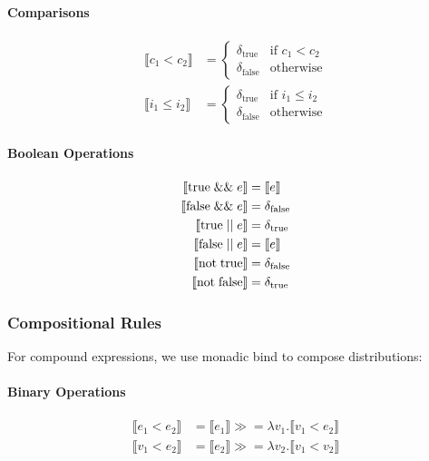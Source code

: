 \paragraph{Comparisons}
\begin{align*}
\llbracket c_1 < c_2 \rrbracket &= \begin{cases}
    \delta_{\text{true}} & \text{if } c_1 < c_2 \\
    \delta_{\text{false}} & \text{otherwise}
\end{cases} \\
\llbracket i_1 \leq i_2 \rrbracket &= \begin{cases}
    \delta_{\text{true}} & \text{if } i_1 \leq i_2 \\
    \delta_{\text{false}} & \text{otherwise}
\end{cases}
\end{align*}

\paragraph{Boolean Operations}
\begin{align*}
\llbracket \text{true} \mathrel{\&\&} e \rrbracket &= \llbracket e \rrbracket \\
\llbracket \text{false} \mathrel{\&\&} e \rrbracket &= \delta_{\text{false}} \\
\llbracket \text{true} \mathrel{||} e \rrbracket &= \delta_{\text{true}} \\
\llbracket \text{false} \mathrel{||} e \rrbracket &= \llbracket e \rrbracket \\
\llbracket \text{not}\; \text{true} \rrbracket &= \delta_{\text{false}} \\
\llbracket \text{not}\; \text{false} \rrbracket &= \delta_{\text{true}}
\end{align*}

\subsubsection{Compositional Rules}

For compound expressions, we use monadic bind to compose distributions:

\paragraph{Binary Operations}
\begin{align*}
\llbracket e_1 < e_2 \rrbracket &= \llbracket e_1 \rrbracket \gg\!= \lambda v_1. \llbracket v_1 < e_2 \rrbracket \\
\llbracket v_1 < e_2 \rrbracket &= \llbracket e_2 \rrbracket \gg\!= \lambda v_2. \llbracket v_1 < v_2 \rrbracket
\end{align*}

